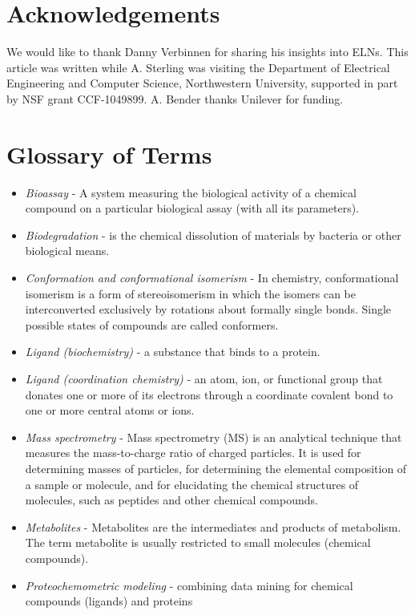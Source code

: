 \documentclass{sig-alternate}
\begin{document}
\section{Acknowledgements}
We would like to thank Danny Verbinnen for sharing his insights into
ELNs.  This article was written while A. Sterling was visiting the
Department of Electrical Engineering and Computer Science,
Northwestern University, supported in part by NSF grant
CCF-1049899. A. Bender thanks Unilever for funding.




\appendix

\section{Glossary of Terms}
\begin{itemize}
\item \textit{Bioassay} - A system measuring the biological activity of a chemical compound on a particular
    biological assay (with all its parameters).
\item \textit{Biodegradation} - is the chemical dissolution of materials by bacteria or other biological means.
\item \textit{Conformation and conformational isomerism} - In chemistry, conformational isomerism is a form of
    stereoisomerism in which the isomers can be interconverted exclusively by rotations about formally single
    bonds.
    Single possible states of compounds are called conformers.
\item \textit{Ligand (biochemistry)} - a substance that binds to a protein.
\item \textit{Ligand (coordination chemistry)} - an atom, ion, or functional group that donates one or more of its
    electrons through a coordinate covalent bond to one or more central atoms or ions.
\item \textit{Mass spectrometry} - Mass spectrometry (MS) is an analytical technique that measures the
    mass-to-charge ratio of charged particles. It is used for determining masses of particles, for determining the
    elemental composition of a sample or molecule, and for elucidating the chemical structures of molecules, such
    as
    peptides and other chemical compounds.
\item \textit{Metabolites} - Metabolites are the intermediates and products of metabolism. The term metabolite is
    usually restricted to small molecules (chemical compounds).
\item \textit{Proteochemometric modeling} - combining data mining for chemical compounds (ligands) and proteins

\end{itemize}
\end{document}
